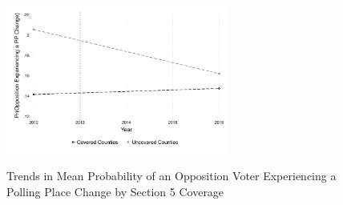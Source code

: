 \documentclass[12pt]{article}
\begin{document}
    \begin{figure}[h!]
    	\begin{center}
        \label{figure_shelby_dind}
    	\caption{Trends in Mean Probability of an Opposition Voter Experiencing a Polling Place Change by Section 5 Coverage}
              \includegraphics[width=0.65\textwidth]{../../50_results_full/shelby_dind.pdf}\\
            \end{center}
        \end{figure} \normalsize



\end{document}
